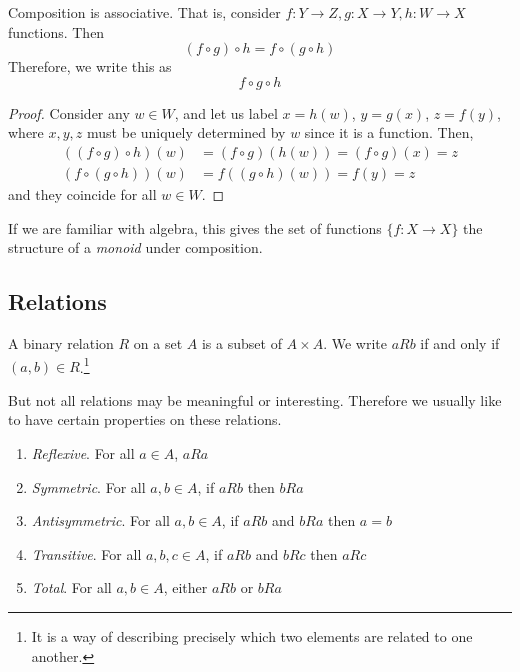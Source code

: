 \documentclass{article}
\begin{document}
    \begin{theorem}[Associativity]
      Composition is associative. That is, consider $f: Y \rightarrow Z, g: X \rightarrow Y, h: W \rightarrow X$ functions. Then 
      \begin{equation}
        (f \circ g) \circ h = f \circ (g \circ h)
      \end{equation} 
      Therefore, we write this as 
      \begin{equation}
        f \circ g \circ h
      \end{equation}
    \end{theorem}
    \begin{proof}
      Consider any $w \in W$, and let us label $x = h(w)$, $y = g(x)$, $z = f(y)$, where $x, y, z$ must be uniquely determined by $w$ since it is a function. Then, 
      \begin{align}
        ((f \circ g) \circ h) (w) & = (f \circ g) (h(w)) = (f \circ g) (x) = z  \\
        (f \circ (g \circ h)) (w) & = f ((g \circ h)(w)) = f (y) = z
      \end{align}
      and they coincide for all $w \in W$. 
    \end{proof} 

    If we are familiar with algebra, this gives the set of functions $\{f: X \rightarrow X\}$ the structure of a \textit{monoid} under composition. 

  \subsection{Relations}

    \begin{definition}[Relation]
      A binary relation $R$ on a set $A$ is a subset of $A \times A$. We write $aRb$ if and only if $(a,b) \in R$.\footnote{It is a way of describing precisely which two elements are related to one another.} 
    \end{definition} 

    But not all relations may be meaningful or interesting. Therefore we usually like to have certain properties on these relations. 
    \begin{enumerate}
      \item \textit{Reflexive}. For all $a \in A$, $aRa$
      \item \textit{Symmetric}. For all $a,b \in A$, if $aRb$ then $bRa$
      \item \textit{Antisymmetric}. For all $a,b \in A$, if $aRb$ and $bRa$ then $a=b$
      \item \textit{Transitive}. For all $a,b,c \in A$, if $aRb$ and $bRc$ then $aRc$
      \item \textit{Total}. For all $a,b \in A$, either $aRb$ or $bRa$
    \end{enumerate}
\end{document}
